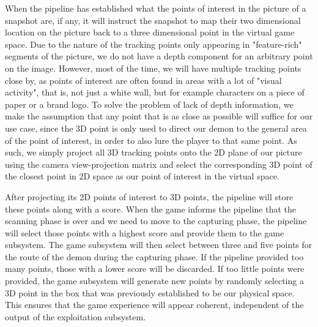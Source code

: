 When the pipeline has established what the points of interest in the picture of a snapshot are, if any, it will instruct the snapshot to map their two dimensional location on the picture back to a three dimensional point in the virtual game space.
Due to the nature of the tracking points only appearing in "feature-rich" segments of the picture, we do not have a depth component for an arbitrary point on the image.
However, most of the time, we will have multiple tracking points close by, as points of interest are often found in areas with a lot of "visual activity", that is, not just a white wall, but for example characters on a piece of paper or a brand logo.
To solve the problem of lack of depth information, we make the assumption that any point that is as close as possible will suffice for our use case, since the 3D point is only used to direct our demon to the general area of the point of interest, in order to also lure the player to that same point.
As such, we simply project all 3D tracking points onto the 2D plane of our picture using the camera view-projection matrix and select the corresponding 3D point of the closest point in 2D space as our point of interest in the virtual space.

After projecting its 2D points of interest to 3D points, the pipeline will store these points along with a score.
When the game informs the pipeline that the scanning phase is over and we need to move to the capturing phase, the pipeline will select those points with a highest score and provide them to the game subsystem.
The game subsystem will then select between three and five points for the route of the demon during the capturing phase.
If the pipeline provided too many points, those with a lower score will be discarded.
If too little points were provided, the game subsystem will generate new points by randomly selecting a 3D point in the box that was previously established to be our physical space.
This ensures that the game experience will appear coherent, independent of the output of the exploitation subsystem.
